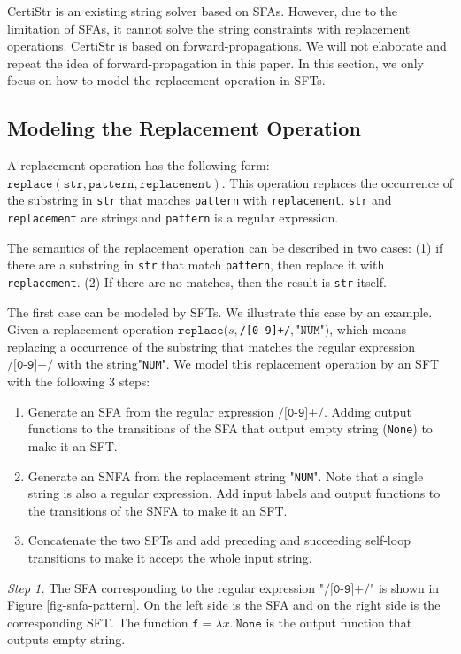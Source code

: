 \documentclass[a4paper,UKenglish,cleveref, autoref, anonymous, thm-restate]{lipics-v2021}
\begin{document}
CertiStr is an existing string solver based on SFAs. However, due to the limitation of SFAs, it cannot solve the string constraints with replacement operations. CertiStr is based on forward-propagations. We will not elaborate and repeat the idea of forward-propagation in this paper. In this section, we only focus on how to model the replacement operation in SFTs.


\subsection{Modeling the Replacement Operation}


A replacement operation has the following form: $\texttt{replace}(\texttt{str}, \texttt{pattern}, \texttt{replacement})$. This operation replaces the occurrence of the substring in \texttt{str} that matches \texttt{pattern} with \texttt{replacement}. \texttt{str} and \texttt{replacement} are strings and \texttt{pattern} is a regular expression.

The semantics of the replacement operation can be described in two cases: (1) if there are a substring in \texttt{str} that match \texttt{pattern}, then replace it with \texttt{replacement}. (2) If there are no matches, then the result is \texttt{str} itself.

The first case can be modeled by SFTs. We illustrate this case by an example. Given a replacement operation $\texttt{replace}(s, $\texttt{/[0-9]+/}$, $"$\texttt{NUM}$"$)$, which means replacing a occurrence of the substring that matches the regular expression $\texttt{/[0-9]+/}$ with the string"\texttt{NUM}".
We model this replacement operation by an SFT with the following 3 steps:

\begin{enumerate}
  \item Generate an SFA from the regular expression $\texttt{/[0-9]+/}$. Adding output functions to the transitions of the SFA that output empty string (\texttt{None}) to make it an SFT.
  \item Generate an SNFA from the replacement string "\texttt{NUM}". Note that a single string is also a regular expression. Add input labels and output functions to the transitions of the SNFA to make it an SFT.
  \item Concatenate the two SFTs and add preceding and succeeding self-loop transitions to make it accept the whole input string.
\end{enumerate}


\noindent\emph{Step 1.}
The SFA corresponding to the regular expression "$\texttt{/[0-9]+/}$" is shown in Figure \ref{fig-snfa-pattern}. On the left side is the SFA and on the right side is the corresponding SFT. The function $\texttt{f} = \lambda x.~\texttt{None}$ is the output function that outputs empty string. 
\end{document}
